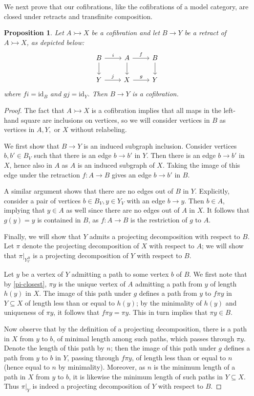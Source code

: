 \documentclass[11pt]{article}
\newtheorem{proposition}[theo]{Proposition}
\theoremstyle{definition}
\numberwithin{equation}{section}
\newcommand{\id}[1][]{\mathrm{id}_{#1}}
\newcommand{\cto}{\rightarrowtail}
\begin{document}
We next prove that our cofibrations, like the cofibrations of a model category, are closed under retracts and transfinite composition.

\begin{proposition}\label{retract-closure}
Let $A \cto X$ be a cofibration and let $B \to Y$ be a retract of $A \cto X$, as depicted below:
\[
\begin{tikzcd}
B \arrow[d] \arrow[r,"i",above] & A \arrow[d] \arrow[r,"f",above] & B \arrow[d] \\
Y \arrow[r,"j",above] & X \arrow[r,"g",above] & Y
\end{tikzcd}
\]
where $fi = \id[B]$ and $gj = \id[Y]$. Then $B \to Y$ is a cofibration.
\end{proposition}

\begin{proof}
The fact that $A \cto X$ is a cofibration implies that all maps in the left-hand square are inclusions on vertices, so we will consider vertices in $B$ as vertices in $A,Y,$ or $X$ without relabeling. 

We first show that $B \to Y$ is an induced subgraph inclusion. Consider vertices $b, b' \in B_V$ such that there is an edge $b \to b'$ in $Y$. Then there is an edge $b \to b'$ in $X$, hence also in $A$ as $A$ is an induced subgraph of $X$. Taking the image of this edge under the retraction $f \colon A \to B$ gives an edge $b \to b'$ in $B$.

A similar argument shows that there are no edges out of $B$ in $Y$. Explicitly, consider a pair of vertices $b \in B_V, y \in Y_V$ with an edge $b \to y$. Then $b \in A$, implying that $y \in A$ as well since there are no edges out of $A$ in $X$. It follows that $g(y) = y$ is contained in $B$, as $f \colon A \to B$ is the restriction of $g$ to $A$. 

Finally, we will show that $Y$ admits a projecting decomposition with respect to $B$. Let $\pi$ denote the projecting decomposition of $X$ with respect to $A$; we will show that $\pi |_{Y_V^B}$ is a projecting decomposition of $Y$ with respect to $B$.

Let $y$ be a vertex of $Y$ admitting a path to some vertex $b$ of $B$. We first note that by \cref{pi-closest}, $\pi y$ is the unique vertex of $A$ admitting a path from $y$ of length $h(y)$ in $X$. The image of this path under $g$ defines a path from $y$ to $f \pi y$ in $Y \subseteq X$ of length less than or equal to $h(y)$; by the minimality of $h(y)$ and uniqueness of $\pi y$, it follows that $f \pi y = \pi y$. This in turn implies that $\pi y \in B$.

Now observe that by the definition of a projecting decomposition, there is a path in $X$ from $y$ to $b$, of minimal length among such paths, which passes through $\pi y$. Denote the length of this path by $n$; then the image of this path under $g$ defines a path from $y$ to $b$ in $Y$, passing through $f \pi y$, of length less than or equal to $n$ (hence equal to $n$ by minimality). Moreover, as $n$ is the minimum length of a path in $X$ from $y$ to $b$, it is likewise the minimum length of such paths in $Y \subseteq X$. Thus $\pi |_{Y}$ is indeed a projecting decomposition of $Y$ with respect to $B$.
\end{proof}
\end{document}
